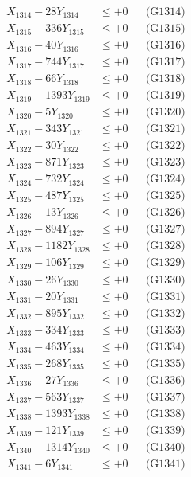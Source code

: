 \documentclass[a4paper,10pt]{article}
\begin{document}
{\begin{align}
X_{1314} - 28Y_{1314} &\leq +0 && \text{(G1314)} \\
X_{1315} - 336Y_{1315} &\leq +0 && \text{(G1315)} \\
X_{1316} - 40Y_{1316} &\leq +0 && \text{(G1316)} \\
X_{1317} - 744Y_{1317} &\leq +0 && \text{(G1317)} \\
X_{1318} - 66Y_{1318} &\leq +0 && \text{(G1318)} \\
X_{1319} - 1393Y_{1319} &\leq +0 && \text{(G1319)} \\
X_{1320} - 5Y_{1320} &\leq +0 && \text{(G1320)} \\
\allowbreak
X_{1321} - 343Y_{1321} &\leq +0 && \text{(G1321)} \\
X_{1322} - 30Y_{1322} &\leq +0 && \text{(G1322)} \\
X_{1323} - 871Y_{1323} &\leq +0 && \text{(G1323)} \\
X_{1324} - 732Y_{1324} &\leq +0 && \text{(G1324)} \\
X_{1325} - 487Y_{1325} &\leq +0 && \text{(G1325)} \\
X_{1326} - 13Y_{1326} &\leq +0 && \text{(G1326)} \\
X_{1327} - 894Y_{1327} &\leq +0 && \text{(G1327)} \\
X_{1328} - 1182Y_{1328} &\leq +0 && \text{(G1328)} \\
X_{1329} - 106Y_{1329} &\leq +0 && \text{(G1329)} \\
X_{1330} - 26Y_{1330} &\leq +0 && \text{(G1330)} \\
\allowbreak
X_{1331} - 20Y_{1331} &\leq +0 && \text{(G1331)} \\
X_{1332} - 895Y_{1332} &\leq +0 && \text{(G1332)} \\
X_{1333} - 334Y_{1333} &\leq +0 && \text{(G1333)} \\
X_{1334} - 463Y_{1334} &\leq +0 && \text{(G1334)} \\
X_{1335} - 268Y_{1335} &\leq +0 && \text{(G1335)} \\
X_{1336} - 27Y_{1336} &\leq +0 && \text{(G1336)} \\
X_{1337} - 563Y_{1337} &\leq +0 && \text{(G1337)} \\
X_{1338} - 1393Y_{1338} &\leq +0 && \text{(G1338)} \\
X_{1339} - 121Y_{1339} &\leq +0 && \text{(G1339)} \\
X_{1340} - 1314Y_{1340} &\leq +0 && \text{(G1340)} \\
\allowbreak
X_{1341} - 6Y_{1341} &\leq +0 && \text{(G1341)} \\

\end{align}}
\end{document}
